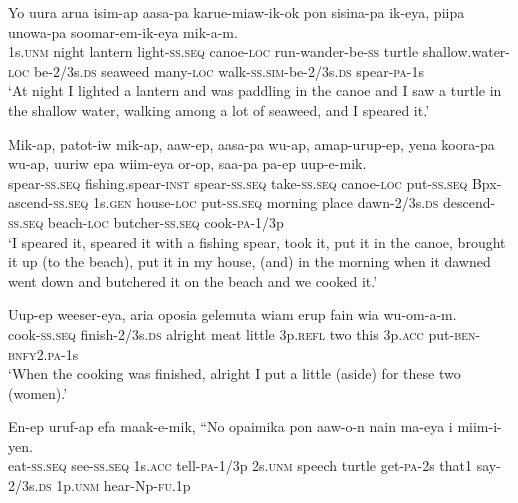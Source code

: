 \ea\label{ex:a:x2}
\gll  Yo  uura  arua  isim-ap  aasa-pa  karue-miaw-ik-ok           pon  sisina-pa  ik-eya,  piipa  unowa-pa               soomar-em-ik-eya  mik-a-m. \\
1s.\textsc{unm}  night  lantern  light-\textsc{ss.seq}  canoe-\textsc{loc}  run-wander-be-\textsc{ss}  turtle  shallow.water-\textsc{loc}  be-2/3s.\textsc{ds}  seaweed  many-\textsc{loc} walk-\textsc{ss}.\textsc{sim}-be-2/3s.\textsc{ds}  spear-\textsc{pa}-1s \\




\glt ‘At night I lighted a lantern and was paddling in the canoe and I saw a turtle in the shallow water, walking among a lot of seaweed, and I speared it.’ \\
\z


\ea\label{ex:a:x3}
\gll  Mik-ap,  patot-iw  mik-ap,  aaw-ep,                    aasa-pa  wu-ap,  amap-urup-ep,  yena  koora-pa             wu-ap,  uuriw  epa  wiim-eya  or-op,                     saa-pa  pa-ep  uup-e-mik. \\
 spear-\textsc{ss.seq}  fishing.spear-\textsc{inst}  spear-\textsc{ss.seq}  take-\textsc{ss.seq}  canoe-\textsc{loc}  put-\textsc{ss.seq}  Bpx-ascend-\textsc{ss.seq}  1s.\textsc{gen}  house-\textsc{loc}  put-\textsc{ss.seq}  morning  place  dawn-2/3s.\textsc{ds}  descend-\textsc{ss.seq}   beach-\textsc{loc}  butcher{}-\textsc{ss.seq}  cook-\textsc{pa}-1/3p \\






\glt ‘I speared it, speared it with a fishing spear, took it, put it in the canoe, brought it up (to the beach), put it in my house, (and) in the morning when it dawned went down and butchered it on the beach and we cooked it.’ \\
\z


\ea\label{ex:a:x4}
\gll  Uup-ep  weeser-eya,  aria  oposia  gelemuta  wiam  erup     fain  wia  wu-om-a-m. \\
 cook-\textsc{ss.seq}  finish-2/3s.\textsc{ds}  alright  meat  little  3p.\textsc{refl}  two  this  3p.\textsc{acc}  put-\textsc{ben}-\textsc{bnfy}2.\textsc{pa}-1s \\


\glt ‘When the cooking was finished, alright I put a little (aside) for these two (women).’ \\
\z


\ea\label{ex:a:x5}
\gll  En-ep  uruf-ap  efa  maak-e-mik,  “No  opaimika     pon  aaw-o-n  nain  ma-eya  i  miim-i-yen. \\
eat-\textsc{ss.seq}  see-\textsc{ss.seq}  1s.\textsc{acc}  tell-\textsc{pa}-1/3p  2s.\textsc{unm}  speech  turtle  get-\textsc{pa}-2s  that1  say-2/3s.\textsc{ds}  1p.\textsc{unm}  hear-Np-\textsc{fu}.1p \\


